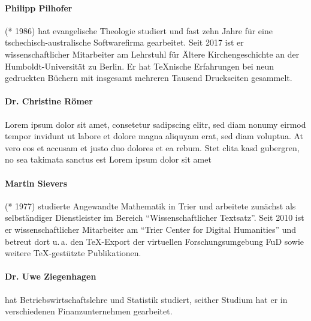 \paragraph{Philipp Pilhofer} (* 1986) hat evangelische Theologie studiert und fast zehn Jahre für eine tschechisch-australische Softwarefirma gearbeitet. Seit 2017 ist er wissenschaftlicher Mitarbeiter am Lehrstuhl für Ältere Kirchengeschichte an der Humboldt-Universität zu Berlin. Er hat \TeX{}nische Erfahrungen bei neun gedruckten Büchern mit insgesamt mehreren Tausend Druckseiten gesammelt.

\paragraph{Dr. Christine Römer} Lorem ipsum dolor sit amet, consetetur sadipscing elitr, sed diam nonumy eirmod tempor invidunt ut labore et dolore magna aliquyam erat, sed diam voluptua. At vero eos et accusam et justo duo dolores et ea rebum. Stet clita kasd gubergren, no sea takimata sanctus est Lorem ipsum dolor sit amet

\paragraph{Martin Sievers} (* 1977) studierte Angewandte Mathematik in Trier und arbeitete zunächst als selbständiger Dienstleister im Bereich \enquote{Wissenschaftlicher Textsatz}. Seit 2010 ist er wissenschaftlicher Mitarbeiter am \enquote{Trier Center for Digital Humanities} und betreut dort u.\,a. den \TeX-Export der virtuellen Forschungsumgebung FuD sowie weitere \TeX-gestützte Publikationen.

\paragraph{Dr. Uwe Ziegenhagen} hat Betriebswirtschaftslehre und Statistik studiert, seither Studium hat er in verschiedenen Finanzunternehmen gearbeitet. 


